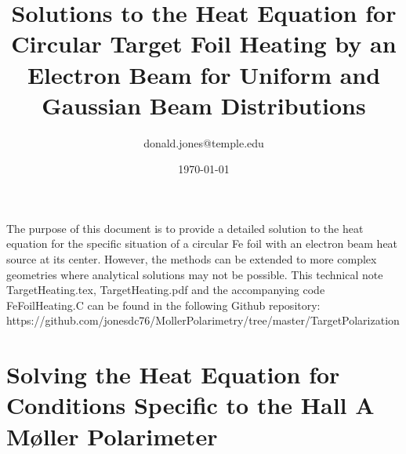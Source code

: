 \documentclass[12pt]{article}
\title{\bfseries\Huge Solutions to the Heat Equation for Circular Target Foil Heating by an Electron Beam for Uniform and Gaussian Beam Distributions}
\author{donald.jones@temple.edu}
\date{\today}
\begin{document}
\maketitle

The purpose of this document is to provide a detailed solution to the heat equation for the specific situation of a circular Fe foil with an electron beam heat source at its center. However, the methods can be extended to more complex geometries where analytical solutions may not be possible. This technical note TargetHeating.tex, TargetHeating.pdf and the accompanying code FeFoilHeating.C can be found in the following Github repository: \\https://github.com/jonesdc76/MollerPolarimetry/tree/master/TargetPolarization
\section{Solving the Heat Equation for Conditions Specific to the Hall A M\o ller Polarimeter}
\end{document}
